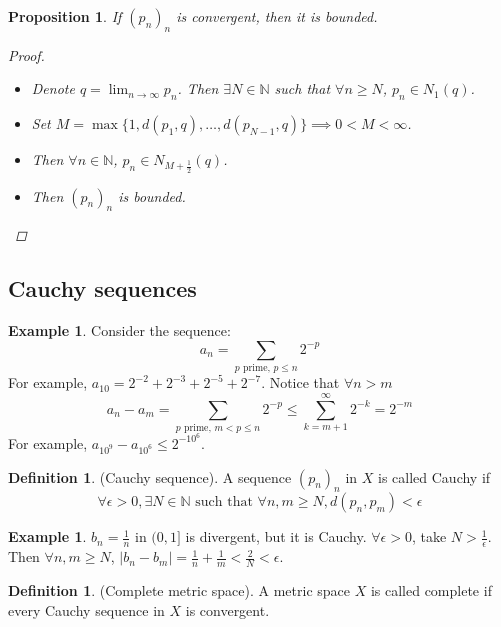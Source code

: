 \documentclass[10pt]{article}
\newcommand{\N}{\mathbb{N}}
\newtheorem{proposition}[theorem]{Proposition}
\theoremstyle{definition}
\newtheorem{definition}[theorem]{Definition}
\newtheorem{example}[theorem]{Example}
\theoremstyle{remark}
\begin{document}
\begin{proposition}
    If $(p_n)_n$ is convergent, then it is bounded.
    \begin{proof}
        \hfill
        \begin{itemize}
            \item Denote $q = \lim_{n \to \infty} p_n$. Then $\exists N \in \N$ such that $\forall n \geq N$, $p_n \in N_1(q)$.
            \item Set $M = \max\{1, d(p_1, q), \ldots, d(p_{N-1}, q)\} \implies 0 < M < \infty$.
            \item Then $\forall n \in \N$, $p_n \in N_{M+\frac{1}{2}}(q)$.
            \item Then $(p_n)_n$ is bounded.
        \end{itemize}
    \end{proof}
\end{proposition}

\subsection{Cauchy sequences}

\begin{example}
    Consider the sequence:
    $$a_n = \sum_{p \text{ prime, } p \leq n} 2^{-p}$$
    For example, $a_{10} = 2^{-2} + 2^{-3} + 2^{-5} + 2^{-7}$. Notice that $\forall n > m$
    $$a_n - a_m = \sum_{p \text{ prime, } m < p \leq n} 2^{-p} \leq \sum_{k = m+1}^\infty 2^{-k} = 2^{-m}$$
    For example, $a_{10^9} - a_{10^6} \leq 2^{-10^6}$.
\end{example}

\begin{definition}
    (Cauchy sequence).
    A sequence $(p_n)_n$ in $X$ is called Cauchy if
    $$\forall \epsilon > 0, \exists N \in \N \text{ such that } \forall n, m \geq N, d(p_n, p_m) < \epsilon$$
\end{definition}

\begin{example}
    $b_n = \frac{1}{n}$ in $(0, 1]$ is divergent, but it is Cauchy. $\forall \epsilon > 0$, take $N > \frac{1}{\epsilon}$.
    Then $\forall n, m \geq N$, $|b_n - b_m| = \frac{1}{n} + \frac{1}{m} < \frac{2}{N} < \epsilon$.
\end{example}

\begin{definition}
    (Complete metric space).
    A metric space $X$ is called complete if every Cauchy sequence in $X$ is convergent.
\end{definition}
\end{document}
